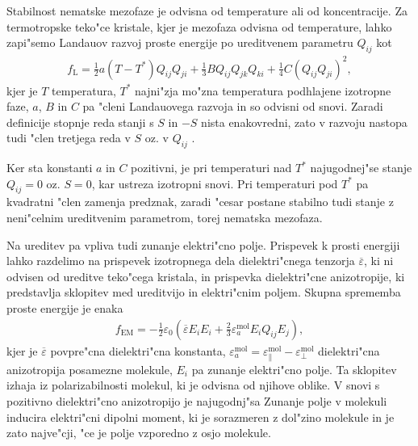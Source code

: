 \documentclass[12pt,twoside,openright,final,a4paper]{report}
\begin{document}
Stabilnost nematske mezofaze je odvisna od temperature ali od koncentracije. 
Za termotropske teko"ce kristale, kjer je mezofaza odvisna od temperature, lahko zapi"semo Landauov razvoj proste energije po ureditvenem parametru $Q_{ij}$ kot
\begin{align}
  f_{\mathrm{L}} = \frac{1}{2}a(T-T^\ast)Q_{ij}Q_{ji} + \frac{1}{3}BQ_{ij}Q_{jk}Q_{ki} + \frac{1}{4}C(Q_{ij}Q_{ji})^2,
\end{align}
kjer je $T$ temperatura, $T^\ast$ najni"zja mo"zna temperatura podhlajene izotropne faze, $a$, $B$ in $C$ pa "cleni Landauovega razvoja in so odvisni od snovi. 
Zaradi definicije stopnje reda stanji s $S$ in $-S$ nista enakovredni, zato v razvoju nastopa tudi "clen tretjega reda v $S$ oz. v $Q_{ij}$ \cite{degennes,ravnik-zumer-ldg}. 

Ker sta konstanti $a$ in $C$ pozitivni, je pri temperaturi nad $T^\ast$ najugodnej"se stanje $Q_{ij}=0$ oz. $S=0$, kar ustreza izotropni snovi. 
Pri temperaturi pod $T^\ast$ pa kvadratni "clen zamenja predznak, zaradi "cesar postane stabilno tudi stanje z neni"celnim ureditvenim parametrom, torej nematska mezofaza. 

Na ureditev pa vpliva tudi zunanje elektri"cno polje. 
Prispevek k prosti energiji lahko razdelimo na prispevek izotropnega dela dielektri"cnega tenzorja $\overline\varepsilon$, ki ni odvisen od ureditve teko"cega kristala, in prispevka dielektri"cne anizotropije, ki predstavlja sklopitev med ureditvijo in elektri"cnim poljem. 
Skupna sprememba proste energije je enaka
\begin{align}
\label{eq:dielektricna-sklopitev}
  f_{\mathrm{EM}} = -\frac{1}{2}\varepsilon_0 \left(\overline\varepsilon E_i E_i + \frac{2}{3}\varepsilon_a^{\mathrm{mol}} E_iQ_{ij}E_j \right),
\end{align}
kjer je $\overline{\varepsilon}$ povpre"cna dielektri"cna konstanta, $\varepsilon_a^{\mathrm{mol}} = \varepsilon_{\parallel}^{\mathrm{mol}} - \varepsilon_{\perp}^{\mathrm{mol}}$ dielektri"cna anizotropija posamezne molekule, $E_i$ pa zunanje elektri"cno polje. 
Ta sklopitev izhaja iz polarizabilnosti molekul, ki je odvisna od njihove oblike. 
V snovi s pozitivno dielektri"cno anizotropijo je najugodnj"sa 
Zunanje polje v molekuli inducira elektri"cni dipolni moment, ki je sorazmeren z dol"zino molekule in je zato najve"cji, "ce je polje vzporedno z osjo molekule. 
\end{document}

